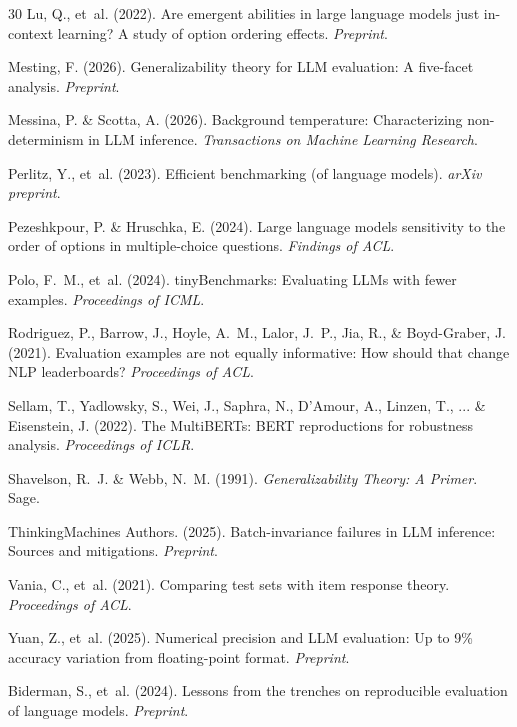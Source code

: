 \documentclass[letterpaper]{article}
\begin{document}
\begin{thebibliography}{30}
Lu, Q., et~al. (2022).
\newblock Are emergent abilities in large language models just in-context learning? A study of option ordering effects.
\newblock \textit{Preprint}.

Mesting, F. (2026).
\newblock Generalizability theory for LLM evaluation: A five-facet analysis.
\newblock \textit{Preprint}.

Messina, P. \& Scotta, A. (2026).
\newblock Background temperature: Characterizing non-determinism in LLM inference.
\newblock \textit{Transactions on Machine Learning Research}.

Perlitz, Y., et~al. (2023).
\newblock Efficient benchmarking (of language models).
\newblock \textit{arXiv preprint}.

Pezeshkpour, P. \& Hruschka, E. (2024).
\newblock Large language models sensitivity to the order of options in multiple-choice questions.
\newblock \textit{Findings of ACL}.

Polo, F.~M., et~al. (2024).
\newblock tinyBenchmarks: Evaluating LLMs with fewer examples.
\newblock \textit{Proceedings of ICML}.

Rodriguez, P., Barrow, J., Hoyle, A.~M., Lalor, J.~P., Jia, R., \& Boyd-Graber, J. (2021).
\newblock Evaluation examples are not equally informative: How should that change NLP leaderboards?
\newblock \textit{Proceedings of ACL}.

Sellam, T., Yadlowsky, S., Wei, J., Saphra, N., D'Amour, A., Linzen, T., ... \& Eisenstein, J. (2022).
\newblock The MultiBERTs: BERT reproductions for robustness analysis.
\newblock \textit{Proceedings of ICLR}.

Shavelson, R.~J. \& Webb, N.~M. (1991).
\newblock \textit{Generalizability Theory: A Primer}.
\newblock Sage.

ThinkingMachines Authors. (2025).
\newblock Batch-invariance failures in LLM inference: Sources and mitigations.
\newblock \textit{Preprint}.

Vania, C., et~al. (2021).
\newblock Comparing test sets with item response theory.
\newblock \textit{Proceedings of ACL}.

Yuan, Z., et~al. (2025).
\newblock Numerical precision and LLM evaluation: Up to 9\% accuracy variation from floating-point format.
\newblock \textit{Preprint}.

Biderman, S., et~al. (2024).
\newblock Lessons from the trenches on reproducible evaluation of language models.
\newblock \textit{Preprint}.

\end{thebibliography}
\end{document}
